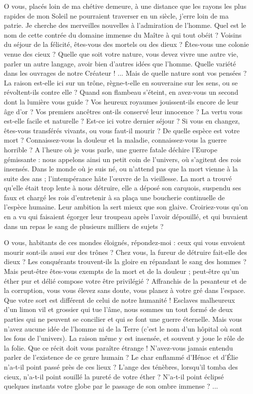 \documentclass[a4paper, 11pt, oneside]{article}
\begin{document}
O vous, placés loin de ma chétive demeure, à une distance que les rayons les plus rapides de mon Soleil ne pourraient traverser en un siècle, j'erre loin de ma patrie. Je cherche des merveilles nouvelles à l'admiration de l'homme. Quel est le nom de cette contrée du domaine immense du Maître à qui tout obéit ? Voisins du séjour de la félicité, êtes-vous des mortels ou des dieux ? Êtes-vous une colonie venue des cieux ? Quelle que soit votre nature, vous devez vivre une autre vie, parler un autre langage, avoir bien d'autres idées que l'homme. Quelle variété dans les ouvrages de notre Créateur ! ... Mais de quelle nature sont vos pensées ? La raison est-elle ici sur un trône, règne-t-elle en souveraine sur les sens, ou se révoltent-ils contre elle ? Quand son flambeau s'éteint, en avez-vous un second dont la lumière vous guide ? Vos heureux royaumes jouissent-ils encore de leur âge d'or ? Vos premiers ancêtres ont-ils conservé leur innocence ? La vertu vous est-elle facile et naturelle ? Est-ce ici votre dernier séjour ? Si vous en changez, êtes-vous transférés vivants, ou vous faut-il mourir ? De quelle espèce est votre mort ? Connaissez-vous la douleur et la maladie, connaissez-vous la guerre horrible ? A l'heure où je vous parle, une guerre fatale déchire l'Europe gémissante : nous appelons ainsi un petit coin de l'univers, où s'agitent des rois insensés. Dans le monde où je suis né, ou n'attend pas que la mort vienne à la suite des ans ; l'intempérance hâte l'œuvre de la vieillesse. La mort a trouvé qu'elle était trop lente à nous détruire, elle a déposé son carquois, suspendu ses faux et chargé les rois d'entretenir à sa plaça une boucherie continuelle de l'espèce humaine. Leur ambition la sert mieux que son glaive. Croiriez-vous qu'on en a vu qui faisaient égorger leur troupeau après l'avoir dépouillé, et qui buvaient dans un repas le sang de plusieurs milliers de sujets ?

O vous, habitants de ces mondes éloignés, répondez-moi : ceux qui vous envoient mourir sont-ils aussi sur des trônes ? Chez vous, la fureur de détruire fait-elle des dieux ? Les conquérants trouvent-ils la gloire en répandant le sang des hommes ? Mais peut-être êtes-vous exempts de la mort et de la douleur ; peut-être qu'un éther pur et délié compose votre être privilégié ? Affranchis de la pesanteur et de la corruption, vous vous élevez sans doute, vous planez à votre gré dans l'espace. Que votre sort est différent de celui de notre humanité ! Esclaves malheureux d'un limon vil et grossier qui tue l'âme, nous sommes un tout formé de deux parties qui ne peuvent se concilier et qui se font une guerre éternelle. Mais vous n'avez aucune idée de l'homme ni de la Terre (c'est le nom d'un hôpital où sont les fous de l'univers). La raison même y est insensée, et souvent y joue le rôle de la folie. Que ce récit doit vous paraître étrange ! N'avez-vous jamais entendu parler de l'existence de ce genre humain ? Le char enflammé d'Hénoc et d'Élie n'a-t-il point passé près de ces lieux ? L'ange des ténèbres, lorsqu'il tomba des cieux, n'a-t-il point souillé la pureté de votre éther ? N'a-t-il point éclipsé quelques instants votre globe par le passage de son ombre immense ? ...
\end{document}
